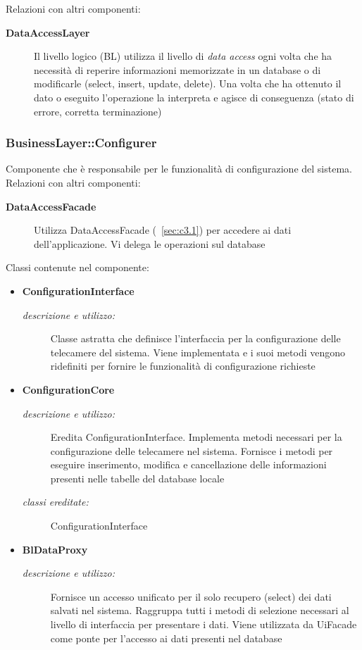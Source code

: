 Relazioni con altri componenti: 
\begin{description} 
\item [\textbf{DataAccessLayer}]
Il livello logico (BL) utilizza il livello di \textit{data access} ogni volta che ha necessità di reperire informazioni memorizzate in un database o di modificarle (select, insert, update, delete). Una volta che ha ottenuto il dato o eseguito l'operazione la interpreta e agisce di conseguenza (stato di errore, corretta terminazione) 
\end{description} 

\subsubsection{BusinessLayer::Configurer} \label{sec:c2.1}
Componente che è responsabile per le funzionalità di configurazione del sistema.\\
Relazioni con altri componenti: 
\begin{description} 
\item [\textbf{DataAccessFacade}]
Utilizza DataAccessFacade (~\ref{sec:c3.1}) per accedere ai dati dell'applicazione. Vi delega le operazioni sul database 
\end{description} 

Classi contenute nel componente: 
\begin{itemize} 
\item \textbf{ConfigurationInterface}
\begin{description}
\item [\textit{descrizione e utilizzo:}] Classe astratta che definisce l'interfaccia per la configurazione delle telecamere del sistema. Viene implementata e i suoi metodi vengono ridefiniti per fornire le funzionalità di configurazione richieste
\end{description}
\item \textbf{ConfigurationCore}
\begin{description}
\item [\textit{descrizione e utilizzo:}] Eredita ConfigurationInterface. Implementa metodi necessari per la configurazione delle telecamere nel sistema. Fornisce i metodi per eseguire inserimento, modifica e cancellazione delle informazioni presenti nelle tabelle del database locale
\item [\textit{classi ereditate:}] ConfigurationInterface
\end{description}
\item \textbf{BlDataProxy}
\begin{description}
\item [\textit{descrizione e utilizzo:}] Fornisce un accesso unificato per il solo recupero (select) dei dati salvati nel sistema. Raggruppa tutti i metodi di selezione necessari al livello di interfaccia per presentare i dati. Viene utilizzata da UiFacade come ponte per l'accesso ai dati presenti nel database
\end{description}
\end{itemize}


